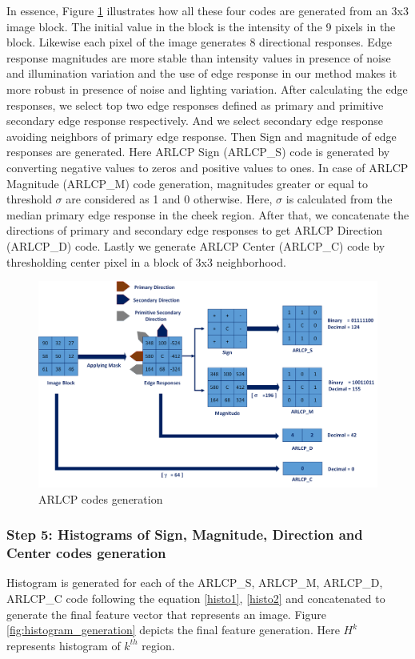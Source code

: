 \documentclass[12pt]{article}
\begin{document}
In essence, Figure \ref{fig:Code_generation} illustrates how all these four codes are generated from an 3x3 image block. The initial value in the block is the intensity of the 9 pixels in the block. Likewise each pixel of the image generates 8 directional responses. Edge response magnitudes are more stable than intensity values in presence of noise and illumination variation and the use of edge response in our method makes it more robust in presence of noise and lighting variation. After calculating the edge responses, we select top two edge responses defined as primary and primitive secondary edge response respectively. And we select secondary edge response avoiding neighbors of primary edge response. Then Sign and magnitude of edge responses are generated. Here ARLCP Sign (ARLCP\_S) code is generated by converting negative values to zeros and positive values to ones. In case of  ARLCP Magnitude (ARLCP\_M) code generation, magnitudes greater or equal to threshold $\sigma$ are considered as 1 and 0 otherwise. Here, $\sigma$ is calculated from the median primary edge response in the cheek region. After that, we concatenate the directions of primary and secondary edge responses to get ARLCP Direction (ARLCP\_D) code. Lastly we generate ARLCP Center (ARLCP\_C) code by thresholding center pixel in a block of 3x3 neighborhood.
\vspace*{0.5cm}
\begin{figure}[H]
	\begin{center}
		\centering
		\includegraphics[width=\textwidth]{Code_generation.png}
		\caption{ARLCP codes generation}
		\label{fig:Code_generation}
	\end{center}
\end{figure}


\subsubsection{Step 5: Histograms of Sign, Magnitude, Direction and Center codes generation} 
Histogram is generated for each of the ARLCP\_S, ARLCP\_M, ARLCP\_D, ARLCP\_C code following the equation \ref{histo1}, \ref{histo2} and concatenated to generate the final feature vector that represents an image. Figure \ref{fig:histogram_generation} depicts the final feature generation. Here $H^k$ represents histogram of $k^{th}$ region.
\end{document}
